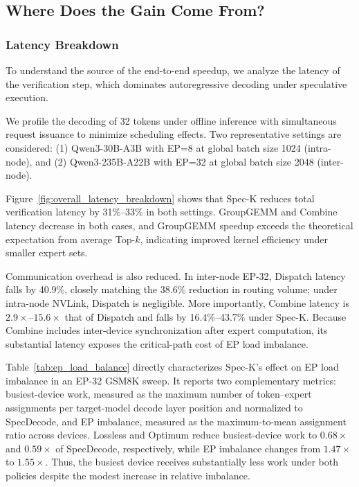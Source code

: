 \documentclass[conference]{IEEEtran}
\theoremstyle{definition} %
\begin{document}
\subsection{Where Does the Gain Come From?}

\subsubsection{Latency Breakdown}

To understand the source of the end-to-end speedup, we analyze the latency of the verification step, which dominates autoregressive decoding under speculative execution.

We profile the decoding of 32 tokens under offline inference with simultaneous request issuance to minimize scheduling effects. Two representative settings are considered: (1) Qwen3-30B-A3B with EP=8 at global batch size 1024 (intra-node), and (2) Qwen3-235B-A22B with EP=32 at global batch size 2048 (inter-node).

Figure~\ref{fig:overall_latency_breakdown} shows that Spec-K reduces total verification latency by 31\%--33\% in both settings. GroupGEMM and Combine latency decrease in both cases, and GroupGEMM speedup exceeds the theoretical expectation from average Top-$k$, indicating improved kernel efficiency under smaller expert sets.

Communication overhead is also reduced. In inter-node EP-32, Dispatch latency falls by 40.9\%, closely matching the 38.6\% reduction in routing volume; under intra-node NVLink, Dispatch is negligible. More importantly, Combine latency is $2.9\times$--$15.6\times$ that of Dispatch and falls by 16.4\%--43.7\% under Spec-K. Because Combine includes inter-device synchronization after expert computation, its substantial latency exposes the critical-path cost of EP load imbalance.

Table~\ref{tab:ep_load_balance} directly characterizes Spec-K's effect on EP load imbalance in an EP-32 GSM8K sweep. It reports two complementary metrics: busiest-device work, measured as the maximum number of token--expert assignments per target-model decode layer position and normalized to SpecDecode, and EP imbalance, measured as the maximum-to-mean assignment ratio across devices. Lossless and Optimum reduce busiest-device work to $0.68\times$ and $0.59\times$ of SpecDecode, respectively, while EP imbalance changes from $1.47\times$ to $1.55\times$. Thus, the busiest device receives substantially less work under both policies despite the modest increase in relative imbalance.
\end{document}
